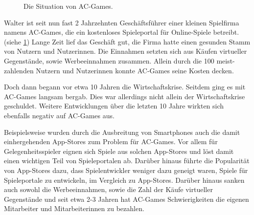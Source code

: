 \begin{figure}
  \caption{Die Situation von AC-Games.}
  \label{fig:03:acgamessituation}
\end{figure}

Walter ist seit nun fast 2 Jahrzehnten Geschäftsführer einer kleinen Spielfirma namens AC-Games, 
die ein kostenloses Spieleportal für Online-Spiele betreibt. (siehe \cref{fig:03:acgamessituation})
Lange Zeit lief das Geschäft gut, die Firma hatte einen gesunden Stamm von Nutzern und Nutzerinnen.
Die Einnahmen setzten sich aus Käufen virtueller Gegenstände, sowie Werbeeinnahmen zusammen.
Allein durch die 100 meist-zahlenden Nutzern und Nutzerinnen konnte AC-Games seine Kosten decken.

Doch dann begann vor etwa 10 Jahren die Wirtschaftskrise. 
Seitdem ging es mit AC-Games langsam bergab.
Dies war allerdings nicht allein der Wirtschaftskrise geschuldet.
Weitere Entwicklungen über die letzten 10 Jahre wirkten sich ebenfalls negativ auf AC-Games aus.

Beispielsweise wurden durch die Ausbreitung von Smartphones auch die damit einhergehenden App-Stores zum Problem für AC-Games.
Vor allem für Gelegenheitsspieler eignen sich Spiele aus solchen App-Stores 
und löst damit einen wichtigen Teil von Spieleportalen ab.
Darüber hinaus führte die Popularität von App-Stores dazu,
dass Spielentwickler weniger dazu geneigt waren, Spiele für Spieleportale zu entwickeln, im Vergleich zu App-Stores.
Darüber hinaus sanken auch sowohl die Werbeeinnahmen, sowie die Zahl der Käufe virtueller Gegenstände
und seit etwa 2-3 Jahren hat AC-Games Schwierigkeiten die eigenen Mitarbeiter und Mitarbeiterinnen zu bezahlen.

